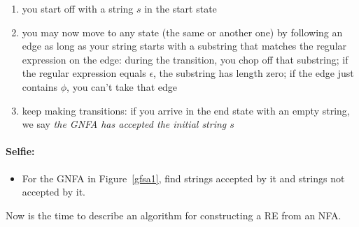 \begin{enumerate}
\item you start off with a string $s$ in the start state
\item you may now move to any state (the same or another one) by
following an edge as long as your string starts with a substring that
matches the regular expression on the edge: during the transition, you
chop off that substring; if the regular expression equals $\epsilon$,
the substring has length zero; if the edge just contains $\phi$, you
can't take that edge
\item keep making transitions: if you arrive in the end state with an
empty string, we say {\em the GNFA has accepted the initial string $s$}
\end{enumerate}

\paragraph{Selfie:}
\begin{itemize}
\item[]
For the GNFA in Figure~\ref{gfsa1}, find strings accepted by it and
strings not accepted by it.
\end{itemize}



Now is the time to describe an algorithm for constructing a RE from an NFA.

